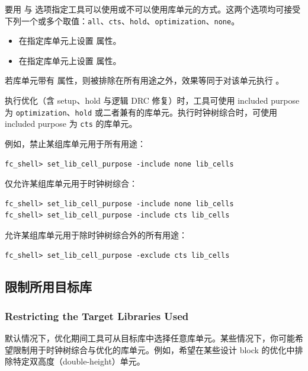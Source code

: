 要用  与  选项指定工具可以使用或不可以使用库单元的方式。这两个选项均可接受下列一个或多个取值：\texttt{all}、\texttt{cts}、\texttt{hold}、\texttt{optimization}、\texttt{none}。
\begin{itemize}
  \item {} 在指定库单元上设置  属性。
  \item {} 在指定库单元上设置  属性。
\end{itemize}

\begin{noteBox}
若库单元带有  属性，则被排除在所有用途之外，效果等同于对该单元执行 。
\end{noteBox}

执行优化（含 setup、hold 与逻辑 DRC 修复）时，工具可使用 included purpose 为 \texttt{optimization}、\texttt{hold} 或二者兼有的库单元。执行时钟树综合时，可使用 included purpose 为 \texttt{cts} 的库单元。

例如，禁止某组库单元用于所有用途：
\begin{lstlisting}
fc_shell> set_lib_cell_purpose -include none lib_cells
\end{lstlisting}

仅允许某组库单元用于时钟树综合：
\begin{lstlisting}
fc_shell> set_lib_cell_purpose -include none lib_cells
fc_shell> set_lib_cell_purpose -include cts lib_cells
\end{lstlisting}

允许某组库单元用于除时钟树综合外的所有用途：
\begin{lstlisting}
fc_shell> set_lib_cell_purpose -exclude cts lib_cells
\end{lstlisting}

\subsection{限制所用目标库}
\subsubsection*{Restricting the Target Libraries Used}

默认情况下，优化期间工具可从目标库中选择任意库单元。某些情况下，你可能希望限制用于时钟树综合与优化的库单元。例如，希望在某些设计 block 的优化中排除特定双高度（double-height）单元。

